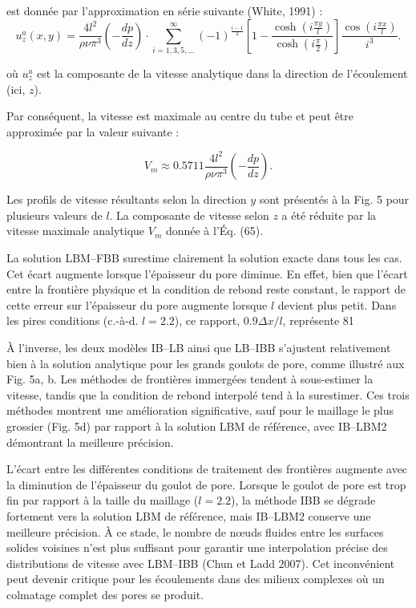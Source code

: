\documentclass[12pt,a4paper]{report}
\begin{document}
est donnée par l’approximation en série suivante (White, 1991) :
\begin{equation}
u_z^a(x, y) = \frac{4l^2}{\rho \nu \pi^3} \left( -\frac{dp}{dz} \right) \cdot \sum_{i=1,3,5,\dots}^{\infty} (-1)^{\frac{i-1}{2}} \left[ 1 - \frac{\cosh(i \frac{\pi y}{l})}{\cosh(i \frac{\pi}{2})} \right] \frac{\cos(i \frac{\pi x}{l})}{i^3}. \tag{64}
\end{equation}

où $u_z^a$ est la composante de la vitesse analytique dans la direction de l'écoulement (ici, $z$).

Par conséquent, la vitesse est maximale au centre du tube et peut être approximée par la valeur suivante :

\begin{equation}
V_m \approx 0.5711 \frac{4l^2}{\rho \nu \pi^3} \left( -\frac{dp}{dz} \right). \tag{65}
\end{equation}

Les profils de vitesse résultants selon la direction $y$ sont présentés à la Fig. 5 pour plusieurs valeurs de $l$. La composante de vitesse selon $z$ a été réduite par la vitesse maximale analytique $V_m$ donnée à l'Éq. (65).

La solution LBM–FBB surestime clairement la solution exacte dans tous les cas. Cet écart augmente lorsque l'épaisseur du pore diminue. En effet, bien que l'écart entre la frontière physique et la condition de rebond reste constant, le rapport de cette erreur sur l'épaisseur du pore augmente lorsque $l$ devient plus petit. Dans les pires conditions (c.-à-d. $l = 2.2$), ce rapport, $0.9\Delta x / l$, représente 81 %

À l'inverse, les deux modèles IB–LB ainsi que LB–IBB s'ajustent relativement bien à la solution analytique pour les grands goulots de pore, comme illustré aux Fig. 5a, b. Les méthodes de frontières immergées tendent à sous-estimer la vitesse, tandis que la condition de rebond interpolé tend à la surestimer. Ces trois méthodes montrent une amélioration significative, sauf pour le maillage le plus grossier (Fig. 5d) par rapport à la solution LBM de référence, avec IB–LBM2 démontrant la meilleure précision.

L'écart entre les différentes conditions de traitement des frontières augmente avec la diminution de l'épaisseur du goulot de pore. Lorsque le goulot de pore est trop fin par rapport à la taille du maillage ($l = 2.2$), la méthode IBB se dégrade fortement vers la solution LBM de référence, mais IB–LBM2 conserve une meilleure précision. À ce stade, le nombre de nœuds fluides entre les surfaces solides voisines n'est plus suffisant pour garantir une interpolation précise des distributions de vitesse avec LBM–IBB (Chun et Ladd 2007). Cet inconvénient peut devenir critique pour les écoulements dans des milieux complexes où un colmatage complet des pores se produit.
\end{document}
